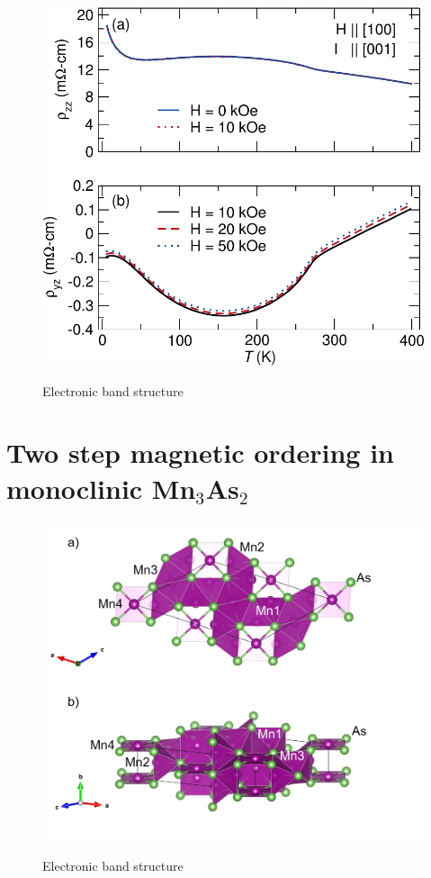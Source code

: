 \documentclass[11pt,edeposit,draftthesis]{uiucthesis2020}
\begin{document}
\begin{mainmatter}
\begin{figure}
\centering\includegraphics[width=\columnwidth]{figures/ch5/resistivity_data_hall_cropped.pdf} \\
\caption{\label{fig:resistivity}
Electronic band structure
}
\end{figure}

\Blindtext[6]

\chapter{Two step magnetic ordering in monoclinic Mn$_3$As$_2$}

\begin{figure}
\centering\includegraphics[width=\columnwidth]{figures/ch6/monoclinic_Mn3As2_75510.png} \\
\caption{\label{fig:Mn3As2}
Electronic band structure
}
\end{figure}


\end{mainmatter}
\end{document}
